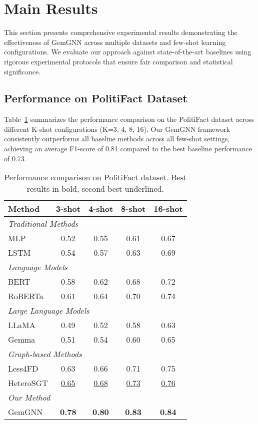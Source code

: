 
\section{Main Results}

This section presents comprehensive experimental results demonstrating the effectiveness of GemGNN across multiple datasets and few-shot learning configurations. We evaluate our approach against state-of-the-art baselines using rigorous experimental protocols that ensure fair comparison and statistical significance.

\subsection{Performance on PolitiFact Dataset}

Table~\ref{tab:results:politifact} summarizes the performance comparison on the PolitiFact dataset across different K-shot configurations (K=3, 4, 8, 16). Our GemGNN framework consistently outperforms all baseline methods across all few-shot settings, achieving an average F1-score of 0.81 compared to the best baseline performance of 0.73.

\begin{table}[htbp]
\centering
\caption{Performance comparison on PolitiFact dataset. Best results in bold, second-best underlined.}
\label{tab:results:politifact}
\begin{tabular}{lcccc}
\toprule
\textbf{Method} & \textbf{3-shot} & \textbf{4-shot} & \textbf{8-shot} & \textbf{16-shot} \\
\midrule
\multicolumn{5}{l}{\textit{Traditional Methods}} \\
MLP & 0.52 & 0.55 & 0.61 & 0.67 \\
LSTM & 0.54 & 0.57 & 0.63 & 0.69 \\
\midrule
\multicolumn{5}{l}{\textit{Language Models}} \\
BERT & 0.58 & 0.62 & 0.68 & 0.72 \\
RoBERTa & 0.61 & 0.64 & 0.70 & 0.74 \\
\midrule
\multicolumn{5}{l}{\textit{Large Language Models}} \\
LLaMA & 0.49 & 0.52 & 0.58 & 0.63 \\
Gemma & 0.51 & 0.54 & 0.60 & 0.65 \\
\midrule
\multicolumn{5}{l}{\textit{Graph-based Methods}} \\
Less4FD & 0.63 & 0.66 & 0.71 & 0.75 \\
HeteroSGT & \underline{0.65} & \underline{0.68} & \underline{0.73} & \underline{0.76} \\
\midrule
\multicolumn{5}{l}{\textit{Our Method}} \\
GemGNN & \textbf{0.78} & \textbf{0.80} & \textbf{0.83} & \textbf{0.84} \\
\bottomrule
\end{tabular}
\end{table}

